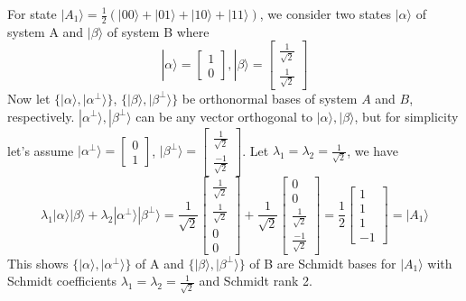 \begin{enumerate}
\begin{enumerate}
    For state $|A_1\rangle =  \frac{1}{2} (|00\rangle + |01\rangle + |10\rangle + |11\rangle ) $, we consider two states $|\alpha\rangle$ of system A and $|\beta\rangle$ of system B where
    \[
   |\alpha \rangle =  \begin{bmatrix}
        1 \\ 0
    \end{bmatrix}, 
    |\beta\rangle =  \begin{bmatrix}
        \frac{1}{\sqrt{2}} \\ \frac{1}{\sqrt{2}}
    \end{bmatrix}
    \]
    Now let $\{ |\alpha \rangle, |\alpha^\bot \rangle \}$, $\{ |\beta \rangle, |\beta^\bot \rangle \}$ be orthonormal bases of system $A$ and $B$, respectively. $|\alpha^\bot \rangle, |\beta^\bot \rangle$ can be any vector orthogonal to $|\alpha \rangle, |\beta\rangle$, but for simplicity let's assume $|\alpha^\bot \rangle = \begin{bmatrix}0 \\ 1 \end{bmatrix}$, $|\beta^\bot \rangle = \begin{bmatrix}\frac{1}{\sqrt{2}} \\ \frac{-1}{\sqrt{2}} \end{bmatrix}$. Let $\lambda_1 = \lambda_2 = \frac{1}{\sqrt{2}}$, we have
    \[
    \lambda_1 |\alpha \rangle  |\beta \rangle + \lambda_2 |\alpha^\bot \rangle |\beta^\bot \rangle = 
    \frac{1}{\sqrt{2}} \begin{bmatrix}
        \frac{1}{\sqrt{2}} \\ \frac{1}{\sqrt{2}} \\ 0 \\ 0
    \end{bmatrix}
    + \frac{1}{\sqrt{2}} \begin{bmatrix}
        0 \\ 0 \\ \frac{1}{\sqrt{2}} \\ \frac{-1}{\sqrt{2}}
    \end{bmatrix} = \frac{1}{2} \begin{bmatrix}
        1 \\ 1 \\ 1 \\ -1
    \end{bmatrix} = |A_1\rangle
    \]
    This shows $\{ |\alpha \rangle, |\alpha^\bot \rangle \}$ of A and $\{ |\beta \rangle, |\beta^\bot \rangle \}$ of B are Schmidt bases for $|A_1\rangle$ with Schmidt coefficients $\lambda_1 = \lambda_2 = \frac{1}{\sqrt{2}}$ and Schmidt rank 2.


\end{enumerate}
\end{enumerate}
